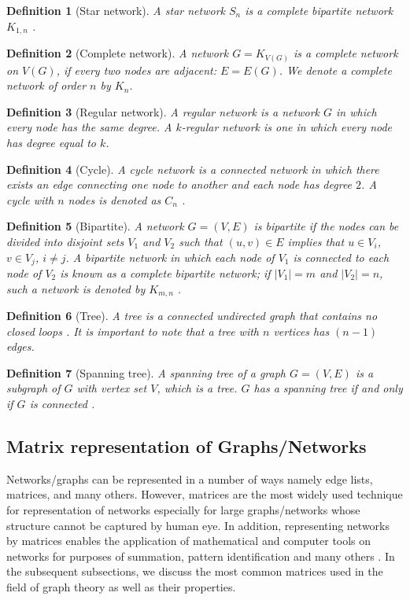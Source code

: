 \documentclass[10pt,a4paper]{article}
\newtheorem{defn}{Definition}
\begin{document}
\begin{defn}[Star network]
	A star network $S_n$ is a complete bipartite network $K_{1,n}$ \citep{wilson1970introduction}.
\end{defn}

\begin{defn}[Complete network]
	A network $G = K_{V (G)}$ is a complete network on $V(G)$, if every two nodes are adjacent: $E = E(G)$. We denote a complete network of order $n$ by $K_n$. 
\end{defn}

\begin{defn}[Regular network]
	A regular network is a network $G$ in which every node has the same degree. A $k$-regular network is one in which every node has degree equal to $k$.
\end{defn}

\begin{defn}[Cycle]
	A cycle network is a connected network in which there exists an edge connecting one node to another and each node has degree $2$. A cycle with $n$ nodes is denoted as $C_n$ \citep{wilson1970introduction}.
\end{defn} 

\begin{defn}[Bipartite]
	A network $G=(V,E)$ is bipartite if the nodes can be divided into disjoint sets $V_1$ and $V_2$ such that $(u,v) \in E$ implies that $u \in V_i$, $v \in V_j$, $i\neq j$. A  bipartite network in which each node of $V_1$ is connected to each node of $V_2$ is known as a complete bipartite network; if $|V_1|= m$ and $|V_2|= n$, such a network is denoted by $K_{m,n}$ \citep{newman2010networks}. 
\end{defn}

\begin{defn}[Tree]
	A tree is a connected undirected graph that contains no closed loops \citep{newman2010networks}. It is important to note that a tree with $n$ vertices has $(n-1)$ edges.
\end{defn}

\begin{defn}[Spanning tree]
	A spanning tree of a graph $G=(V,E)$ is a subgraph of $G$ with vertex set $V$, which is a tree. $G$ has a spanning tree if and only if $G$ is connected \citep{newman2010networks}. 
\end{defn}


\subsection{Matrix representation of Graphs/Networks}
Networks/graphs can be represented in a number of ways namely edge lists, matrices, and many others. However, matrices are the most widely used technique for representation of networks especially for large graphs/networks whose structure cannot be captured by human eye. In addition, representing networks by matrices enables the application of mathematical and computer tools on networks for purposes of summation, pattern identification and many others \citep{chandak2017novel,turan1984succinct}. In the subsequent subsections, we discuss the most common matrices used in the field of graph theory as well as their properties.
\end{document}
